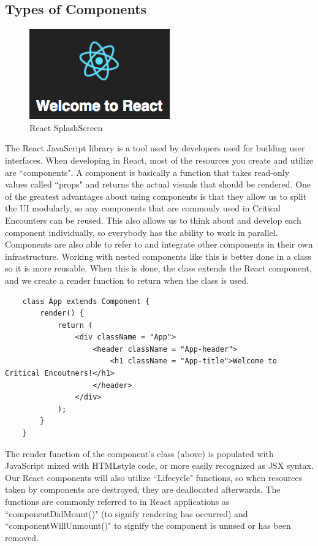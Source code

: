 \documentclass[12pt,a4paper]{report}
\begin{document}
	\newpage
	\subsection{Types of Components}
	\begin{figure}[H]
		\centering
		\includegraphics[scale=.7]{welcometoreact}
		\caption{React SplashScreen}
		\label{fig: React SplashScreen}
	\end{figure}
	The React JavaScript library is a tool used by developers used for building user interfaces. When developing in React, most of the resources you create and utilize are ``components". A component is basically a function that takes read-only values called ``props" and returns the actual visuals that should be rendered. One of the greatest advantages about using components is that they allow us to split the UI modularly, so any components that are commonly used in Critical Encounters can be reused. This also allows us to think about and develop each component individually, so everybody has the ability to work in parallel. Components are also able to refer to and integrate other components in their own infrastructure. Working with nested components like this is better done in a class so it is more reusable. When this is done, the class extends the React component, and we create a render function to return when the class is used.
	\bigskip
	\begin{lstlisting}
	class App extends Component {
		render() {
			return (
				<div className = "App">
					<header className = "App-header">
						<h1 className = "App-title">Welcome to Critical Encoutners!</h1>
					</header>
				</div>
			);
		}
	}
	\end{lstlisting}
	The render function of the component's class (above) is populated with JavaScript mixed with HTMLstyle code, or more easily recognized as JSX syntax. Our React components will also utilize ``Lifecycle" functions, so when resources taken by components are destroyed, they are deallocated afterwards. The functions are commonly referred to in React applications as ``componentDidMount()" (to signify rendering has occurred) and ``componentWillUnmount()" to signify the component is unused or has been removed.
\end{document}
